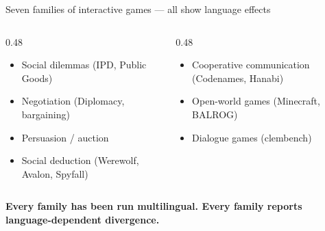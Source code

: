 \documentclass[11pt,aspectratio=169]{beamer}
\newcommand{\takeaway}[1]{%
  \begin{center}
    \colorbox{rsnavy!10}{%
      \begin{minipage}{0.92\textwidth}
        \centering\textbf{#1}
      \end{minipage}}
  \end{center}}
\begin{document}
\begin{frame}{Seven families of interactive games --- all show language effects}
    \large
    \begin{columns}[T]
        \begin{column}{0.48\textwidth}
            \begin{itemize}
                \setlength\itemsep{0.3em}
                \item Social dilemmas (IPD, Public Goods)
                \item Negotiation (Diplomacy, bargaining)
                \item Persuasion / auction
                \item Social deduction (Werewolf, Avalon, Spyfall)
            \end{itemize}
        \end{column}
        \begin{column}{0.48\textwidth}
            \begin{itemize}
                \setlength\itemsep{0.3em}
                \item Cooperative communication (Codenames, Hanabi)
                \item Open-world games (Minecraft, BALROG)
                \item Dialogue games (clembench)
            \end{itemize}
        \end{column}
    \end{columns}
    \vspace{0.5cm}
    \takeaway{Every family has been run multilingual. Every family reports language-dependent divergence.}
\end{frame}
\end{document}
